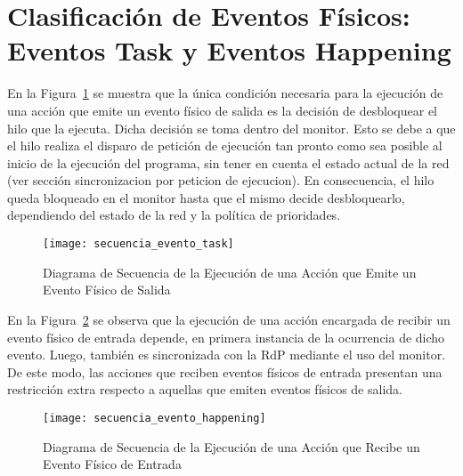 \section{Clasificación de Eventos Físicos: \\ Eventos Task y Eventos Happening}
\label{sec:clasificacion_eventos_fisicos} 

En la Figura~\ref{fig:actividades_evento_task} se muestra que la única
condición necesaria para la ejecución de una acción que emite un evento físico
de salida es la decisión de desbloquear el hilo que la ejecuta. Dicha decisión
se toma dentro del monitor.
Esto se debe a que el hilo realiza el disparo de petición de ejecución tan
pronto como sea posible al inicio de la ejecución del programa, sin tener en
cuenta el estado actual de la red (ver sección sincronizacion por peticion de
ejecucion). En consecuencia, el hilo queda bloqueado en el monitor hasta que el
mismo decide desbloquearlo, dependiendo del estado de la red y la política de
prioridades.

\begin{figure}[H]
	\centering
	\texttt{[image: secuencia\_evento\_task]}
	\caption{Diagrama de Secuencia de la Ejecución de una Acción que Emite un
	Evento Físico de Salida}
	\label{fig:actividades_evento_task}
\end{figure}

En la Figura~\ref{fig:actividades_evento_happening} se observa que
la ejecución de una acción encargada de recibir un evento físico de entrada
depende, en primera instancia de la ocurrencia de dicho evento. Luego, también
es sincronizada con la RdP mediante el uso del monitor. De este modo, las
acciones que reciben eventos físicos de entrada presentan una restricción extra
respecto a aquellas que emiten eventos físicos de salida.



\begin{figure}[H]
	\centering
	\texttt{[image: secuencia\_evento\_happening]}
	\caption{Diagrama de Secuencia de la Ejecución de una Acción que Recibe un
	Evento Físico de Entrada}
	\label{fig:actividades_evento_happening}
\end{figure}

